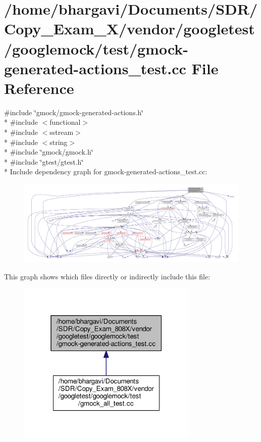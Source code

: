 \hypertarget{gmock-generated-actions__test_8cc}{}\section{/home/bhargavi/\+Documents/\+S\+D\+R/\+Copy\+\_\+\+Exam\+\_\+X/vendor/googletest/googlemock/test/gmock-\/generated-\/actions\+\_\+test.cc File Reference}
\label{gmock-generated-actions__test_8cc}
{\ttfamily \#include \char`\"{}gmock/gmock-\/generated-\/actions.\+h\char`\"{}}\\*
{\ttfamily \#include $<$functional$>$}\\*
{\ttfamily \#include $<$sstream$>$}\\*
{\ttfamily \#include $<$string$>$}\\*
{\ttfamily \#include \char`\"{}gmock/gmock.\+h\char`\"{}}\\*
{\ttfamily \#include \char`\"{}gtest/gtest.\+h\char`\"{}}\\*
Include dependency graph for gmock-\/generated-\/actions\+\_\+test.cc\+:
\nopagebreak
\begin{figure}[H]
\begin{center}
\leavevmode
\includegraphics[width=350pt]{gmock-generated-actions__test_8cc__incl}
\end{center}
\end{figure}
This graph shows which files directly or indirectly include this file\+:
\nopagebreak
\begin{figure}[H]
\begin{center}
\leavevmode
\includegraphics[width=244pt]{gmock-generated-actions__test_8cc__dep__incl}
\end{center}
\end{figure}
